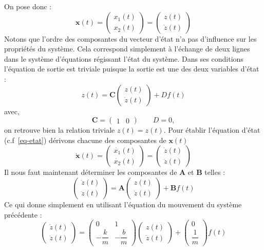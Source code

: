 On pose donc :
\[
    \boldsymbol{x}(t)=
    \begin{pmatrix} x_1(t) \\ x_2(t) \end{pmatrix}=
    \begin{pmatrix} z(t) \\ \dot{z}(t) \end{pmatrix}
\]
Notons que l'ordre des composantes du vecteur d'état n'a pas d'influence sur
les propriétés du système. Cela correspond simplement à l'échange de deux lignes
dans le système d'équations régissant l'état du système.
Dans ses conditions l'équation de sortie est triviale puisque la sortie est
une des deux variables d'état :
\[
    z(t)=\boldsymbol{C}\begin{pmatrix} z(t)\\\dot{z}(t)\end{pmatrix} + Df(t)
\]
avec,
\[
    \boldsymbol{C}=\begin{pmatrix} 1 & 0 \end{pmatrix}\quad\quad D=0,
\]
on retrouve bien la relation triviale $z(t)=z(t)$.
\newpage
\restoregeometry
\captionsetup{width=0.9\linewidth}
Pour établir l'équation d'état (c.f~\cref{eq-etat}) dérivons chacune des 
composantes de $\boldsymbol{x}(t)$
\[
    \boldsymbol{\dot{x}}(t)=
    \begin{pmatrix} \dot{x_1}(t) \\ \dot{x_2}(t) \end{pmatrix}=
    \begin{pmatrix} \dot{z}(t) \\ \ddot{z}(t) \end{pmatrix}
\]
Il nous faut maintenant déterminer les composantes de $\boldsymbol{A}$ et 
$\boldsymbol{B}$ telles :
\[
    \begin{pmatrix} \dot{z}(t) \\ \ddot{z}(t) \end{pmatrix}=
    \boldsymbol{A}\begin{pmatrix} z(t) \\ \dot{z}(t) \end{pmatrix} +
    \boldsymbol{B}f(t)
\]
Ce qui donne simplement en utilisant l'équation du mouvement du système 
précédente :
\[
    \begin{pmatrix} \dot{z}(t) \\ \ddot{z}(t) \end{pmatrix}=
    \begin{pmatrix} 
        0 & 1 \\[1em]
        -\dfrac{k}{m} & -\dfrac{b}{m}
    \end{pmatrix} 
    \begin{pmatrix} z(t) \\ \dot{z}(t) \end{pmatrix} +
    \begin{pmatrix} 0 \\[1em] \dfrac{1}{m} \end{pmatrix}f(t)
\]
